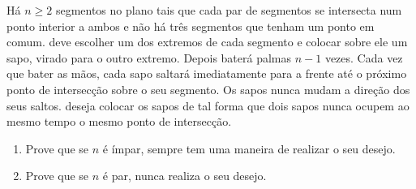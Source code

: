 Há $n\ge 2$ segmentos no plano tais que cada par de segmentos se intersecta num ponto interior a ambos e não há três segmentos que tenham um ponto em comum.
 deve escolher um dos extremos de cada segmento e colocar sobre ele um sapo, virado para o outro extremo.
Depois  baterá palmas $n - 1$ vezes. 
Cada vez que  bater as mãos, cada sapo saltará imediatamente para a frente até o próximo ponto de intersecção sobre o seu segmento. Os sapos nunca mudam a direção dos seus saltos.
 deseja colocar os sapos de tal forma que dois sapos nunca ocupem ao mesmo tempo o mesmo ponto de intersecção.
\begin{enumerate}[label = (\alph*)]
	\item Prove que se $n$ é ímpar,  sempre tem uma maneira de realizar o seu desejo.
	\item Prove que se $n$ é par,  nunca realiza o seu desejo.
\end{enumerate}
